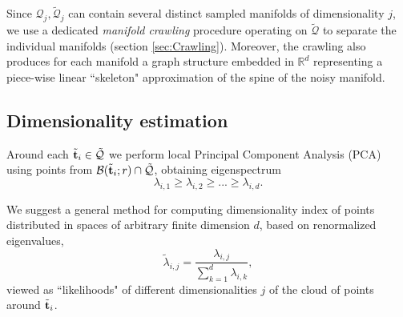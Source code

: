 Since $\mathcal{Q}_j, \tilde{\mathcal{Q}}_j$ can contain several distinct sampled manifolds of dimensionality $j$,
we use a dedicated \emph{manifold crawling} procedure operating on $\tilde{\mathcal{Q}}$ to separate the individual manifolds (section \ref{sec:Crawling}).
Moreover, the crawling also produces for each manifold a graph structure embedded in $\mathbb{R}^d$ representing a piece-wise linear ``skeleton" approximation of the spine of the noisy manifold.




\subsection{Dimensionality estimation} \label{sec:D_Index}
Around each $\tilde{\boldsymbol{\mathbf{t}}}_i \in \tilde{ \mathcal{Q}}$ we perform local Principal Component Analysis (PCA) using points from  $\mathcal{B}(\tilde{\boldsymbol{\mathbf{t}}}_i;r) \cap \tilde {\mathcal{Q}}$, obtaining eigenspectrum
\[\lambda_{i,1} \ge \lambda_{i,2} \ge ... \ge \lambda_{i,d}.\]


We suggest a general method for computing dimensionality index of points distributed in spaces of arbitrary finite dimension $d$, based on renormalized eigenvalues,
\[
\tilde{\lambda}_{i,j} = \frac{\lambda_{i,j}}{\sum_{k=1}^d \lambda_{i,k}},
\]
viewed as ``likelihoods" of different dimensionalities $j$ of the cloud of points around $\tilde{\boldsymbol{\mathbf{t}}}_i$.
